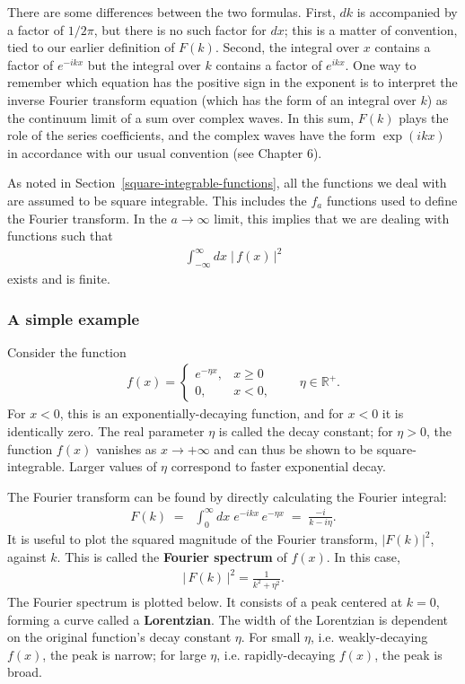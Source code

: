\documentclass[10pt,a4paper]{article}
\begin{document}
There are some differences between the two formulas.  First, $dk$ is
accompanied by a factor of $1/2\pi$, but there is no such factor for
$dx$; this is a matter of convention, tied to our earlier definition
of $F(k)$.  Second, the integral over $x$ contains a factor of
$e^{-ikx}$ but the integral over $k$ contains a factor of
$e^{ikx}$. One way to remember which equation has the positive sign in
the exponent is to interpret the inverse Fourier transform equation
(which has the form of an integral over $k$) as the continuum limit of
a sum over complex waves. In this sum, $F(k)$ plays the role of the
series coefficients, and the complex waves have the form $\exp(ikx)$
in accordance with our usual convention (see Chapter 6).

As noted in Section~\ref{square-integrable-functions}, all the
functions we deal with are assumed to be square integrable. This
includes the $f_a$ functions used to define the Fourier transform. In
the $a \rightarrow \infty$ limit, this implies that we are dealing
with functions such that
\begin{align*}
  \int_{-\infty}^{\infty} dx\; \big|\,f(x)\,\big|^2
\end{align*}
exists and is finite.

\subsubsection{A simple example}
\label{simple-example}

Consider the function
\begin{align}
  f(x) = \left\{\begin{array}{cl}e^{-\eta x}, & x \ge 0 \\ 0, & x < 0,\end{array}\right. \qquad \eta \in \mathbb{R}^+.
\end{align}
For $x < 0$, this is an exponentially-decaying function, and for $x <
0$ it is identically zero. The real parameter $\eta$ is called the
decay constant; for $\eta > 0$, the function $f(x)$ vanishes as $x
\rightarrow +\infty$ and can thus be shown to be
square-integrable. Larger values of $\eta$ correspond to faster
exponential decay.

The Fourier transform can be found by directly calculating the Fourier
integral:
\begin{align}
  F(k) \;=\; \;\int_{0}^\infty dx\; e^{-i kx}\, e^{-\eta x} \;=\; \frac{-i}{k - i \eta}.
\end{align}
It is useful to plot the squared magnitude of the Fourier transform,
$|F(k)|^2$, against $k$.  This is called the \textbf{Fourier spectrum}
of $f(x)$.  In this case,
\begin{align}
  \big|\,F(k)\,\big|^2 = \frac{1}{k^2 + \eta^2}.
\end{align}
The Fourier spectrum is plotted below.  It consists of a peak centered
at $k = 0$, forming a curve called a \textbf{Lorentzian}.  The width
of the Lorentzian is dependent on the original function's decay
constant $\eta$. For small $\eta$, i.e. weakly-decaying $f(x)$, the
peak is narrow; for large $\eta$, i.e. rapidly-decaying $f(x)$, the
peak is broad.
\end{document}
